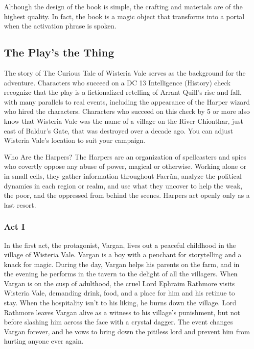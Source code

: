 \documentclass[10pt,a4paper,twoside,bg=print,twocolumn,openany,nodeprecatedcode]{dndbook}
\begin{document}
Although the design of the book is simple, the crafting and materials are of the highest quality. In fact, the book is a magic object that transforms into a portal when the activation phrase is spoken.

\subsection{The Play's the Thing}
The story of The Curious Tale of Wisteria Vale serves as the background for the adventure. Characters who succeed on a DC 13 Intelligence (History) check recognize that the play is a fictionalized retelling of Arrant Quill's rise and fall, with many parallels to real events, including the appearance of the Harper wizard who hired the characters. Characters who succeed on this check by 5 or more also know that Wisteria Vale was the name of a village on the River Chionthar, just east of Baldur's Gate, that was destroyed over a decade ago. You can adjust Wisteria Vale's location to suit your campaign.

\begin{DndSidebar}[float=!b]{Who Are the Harpers?}
The Harpers are an organization of spellcasters and spies who covertly oppose any abuse of power, magical or otherwise. Working alone or in small cells, they gather information throughout Faerûn, analyze the political dynamics in each region or realm, and use what they uncover to help the weak, the poor, and the oppressed from behind the scenes. Harpers act openly only as a last resort.



\end{DndSidebar}

\subsubsection{Act I}
In the first act, the protagonist, Vargan, lives out a peaceful childhood in the village of Wisteria Vale. Vargan is a boy with a penchant for storytelling and a knack for magic. During the day, Vargan helps his parents on the farm, and in the evening he performs in the tavern to the delight of all the villagers. When Vargan is on the cusp of adulthood, the cruel Lord Ephraim Rathmore visits Wisteria Vale, demanding drink, food, and a place for him and his retinue to stay. When the hospitality isn't to his liking, he burns down the village. Lord Rathmore leaves Vargan alive as a witness to his village's punishment, but not before slashing him across the face with a crystal dagger. The event changes Vargan forever, and he vows to bring down the pitiless lord and prevent him from hurting anyone ever again.
\end{document}
